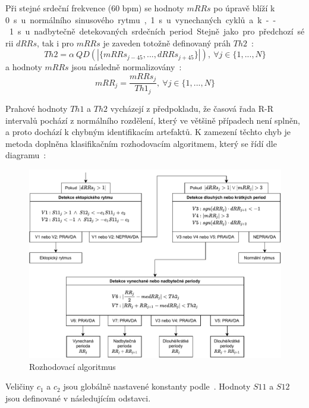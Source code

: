 Při stejné srdeční frekvence (60 bpm) se hodnoty $mRRs$ po úpravě blíží k
0~\si\s~u normálního sinusového rytmu, 1~\si\s~ u vynechaných cyklů a k
--1~\si\s~ u nadbytečně detekovaných srdečních period. Stejně jako pro předchozí
sérii $dRRs$, tak i pro $mRRs$ je zaveden totožně definovaný práh
$Th2$~\cite{Lipponen2019}:
\begin{equation}
    Th2 = \alpha~QD(|\{mRRs_{j-45},...,dRRs_{j+45}\}|), ~\forall j \in \{1,...,N\}
\end{equation}
a hodnoty $mRRs$ jsou následně normalizovány~\cite{Lipponen2019}:
\begin{equation}
    mRR_j = \frac{mRRs_j}{Th1_j}, ~\forall j \in \{1,...,N\}
\end{equation}

Prahové hodnoty $Th1$ a $Th2$ vycházejí z předpokladu, že časová řada R-R
intervalů pochází z normálního rozdělení, který ve většině případech není
splněn, a proto dochází k chybným identifikacím artefaktů. K zamezení těchto
chyb je metoda doplněna klasifikačním rozhodovacím algoritmem, který se řídí dle
diagramu~\cite{Lipponen2019}:

\begin{figure}[h]
    \begin{center}
        \includegraphics[width=1\textwidth]{../assets/diagrams/rr_decision}
        \caption{Rozhodovací algoritmus~\cite{Lipponen2019}}
        \label{fig:rr_decision}
    \end{center}
\end{figure}

Veličiny $c_1$ a $c_2$ jsou globálně nastavené konstanty
podle~\cite{Lipponen2019}. Hodnoty $S11$ a $S12$ jsou definované v následujícím
odstavci.

